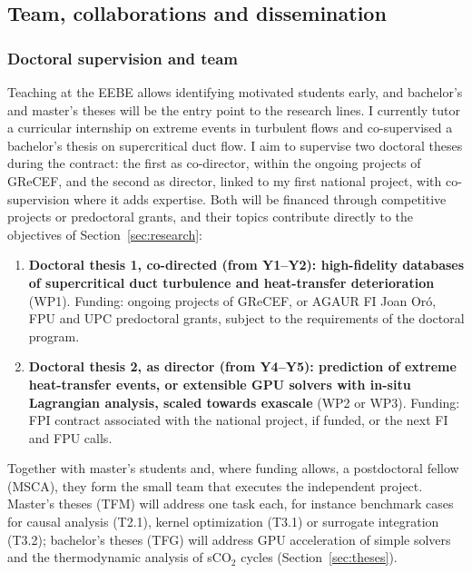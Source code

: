 \documentclass[11pt]{article}
\begin{document}
\subsection{Team, collaborations and dissemination}\label{sec:mobility}\label{sec:dissemination}
\subsubsection*{Doctoral supervision and team}
Teaching at the EEBE allows identifying motivated students early, and bachelor's and
master's theses will be the entry point to the research lines. I currently tutor a
curricular internship on extreme events in turbulent flows and co-supervised a bachelor's
thesis on supercritical duct flow. I aim to supervise two doctoral theses during the
contract: the first as co-director, within the ongoing projects of GReCEF, and the second as
director, linked to my first national project, with co-supervision where it adds expertise. Both
will be financed through competitive projects or predoctoral grants, and their
topics contribute directly to the objectives of Section~\ref{sec:research}:
\begin{enumerate}
  \item \textbf{Doctoral thesis 1, co-directed (from Y1--Y2): high-fidelity databases of supercritical duct
  turbulence and heat-transfer deterioration} (WP1). Funding: ongoing projects of GReCEF, or AGAUR
  FI Joan Or\'o, FPU and UPC predoctoral grants, subject to the requirements of the doctoral program.
  \item \textbf{Doctoral thesis 2, as director (from Y4--Y5): prediction of extreme heat-transfer events, or
  extensible GPU solvers with in-situ Lagrangian analysis, scaled towards exascale} (WP2 or WP3). Funding: FPI
  contract associated with the national project, if funded, or the next FI and FPU calls.
\end{enumerate}
Together with master's students and, where funding allows, a postdoctoral fellow (MSCA), they
form the small team that executes the independent project.
Master's theses (TFM) will address one task each, for instance benchmark cases for causal
analysis (T2.1), kernel optimization (T3.1) or surrogate integration (T3.2); bachelor's
theses (TFG) will address GPU acceleration of simple solvers and the thermodynamic analysis of
sCO$_2$ cycles (Section~\ref{sec:theses}).
\end{document}
